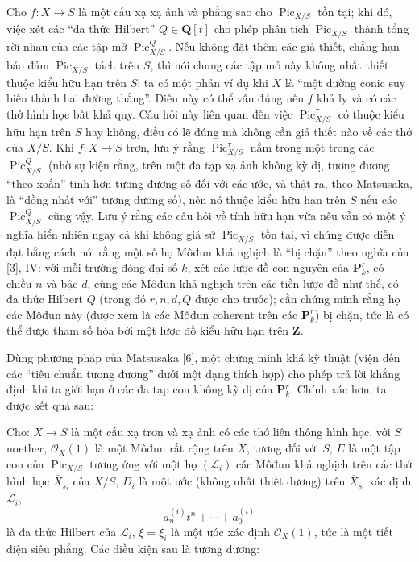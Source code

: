
Cho $f:X\longrightarrow S$ là một cấu xạ xạ ảnh và phẳng sao cho
$\operatorname{Pic}_{X/S}$ tồn tại; khi đó, việc xét các ``đa thức Hilbert''
$Q\in\mathbf Q[t]$ cho phép phân tích $\operatorname{Pic}_{X/S}$ thành tổng
rời nhau của các tập mở $\operatorname{Pic}_{X/S}^Q$. Nếu không đặt thêm các
giả thiết, chẳng hạn bảo đảm $\operatorname{Pic}_{X/S}$ tách trên $S$, thì
nói chung các tập mở này không nhất thiết thuộc kiểu hữu hạn trên $S$; ta có
một phản ví dụ khi $X$ là ``một đường conic suy biến thành hai đường thẳng''.
Điều này
có thể vẫn đúng nếu $f$ khả ly và có các thớ hình học bất khả quy. Câu hỏi này
liên quan đến việc $\operatorname{Pic}_{X/S}^\tau$ có thuộc kiểu hữu hạn trên
$S$ hay không, điều có lẽ đúng mà không cần giả thiết nào về các thớ của
$X/S$. Khi $f:X\longrightarrow S$ trơn, lưu ý rằng
$\operatorname{Pic}_{X/S}^\tau$ nằm trong một trong các
$\operatorname{Pic}_{X/S}^Q$ (nhờ sự kiện rằng, trên một đa tạp xạ ảnh không
kỳ dị, tương đương ``theo xoắn'' tinh hơn tương đương số đối với các ước, và
thật ra, theo Matsusaka, là ``đồng nhất với'' tương đương số), nên nó thuộc
kiểu hữu hạn trên $S$ nếu các $\operatorname{Pic}_{X/S}^Q$ cũng vậy. Lưu ý
rằng các câu hỏi về tính hữu hạn vừa nêu vẫn có một ý nghĩa hiển nhiên ngay cả khi
không giả sử $\operatorname{Pic}_{X/S}$ tồn tại, vì chúng được diễn đạt bằng
cách nói rằng một số họ Môđun khả nghịch là ``bị chặn'' theo nghĩa của [3],
IV: với mỗi trường đóng đại số $k$, xét các lược đồ con nguyên của
$\mathbf P_k^r$, có chiều $n$ và bậc $d$, cùng các Môđun khả nghịch trên các
tiền lược đồ như thế, có đa thức Hilbert $Q$ (trong đó $r,n,d,Q$ được cho
trước); cần chứng minh rằng họ các Môđun này (được xem là các Môđun coherent
trên các $\mathbf P_k^r$) bị chặn, tức là có thể được tham số hóa bởi một lược
đồ kiểu hữu hạn trên $\mathbf Z$.

Dùng phương pháp của Matsusaka [6], một chứng minh khá kỹ thuật (viện đến các
``tiêu chuẩn tương đương'' dưới một dạng thích hợp) cho phép trả lời khẳng định
khi ta giới hạn ở các đa tạp con không kỳ dị của $\mathbf P_k^r$. Chính xác
hơn, ta được kết quả sau:

 Cho: $X\longrightarrow S$ là một cấu xạ trơn và xạ ảnh có các thớ liên thông hình học, với $S$
noether, $\mathcal O_X(1)$ là một Môđun rất rộng trên $X$, tương đối với $S$,
$E$ là một tập con của $\operatorname{Pic}_{X/S}$ tương ứng với một họ
$(\mathcal L_i)$ các Môđun khả nghịch trên các thớ hình học
$\overline X_{s_i}$ của $X/S$, $D_i$ là một ước (không nhất thiết dương) trên
$\overline X_{s_i}$ xác định $\mathcal L_i$,
\[
a_n^{(i)}t^n+\cdots+a_0^{(i)}
\]
là đa thức Hilbert của $\mathcal L_i$, $\xi=\xi_i$ là một ước xác định
$\mathcal O_X(1)$, tức là một tiết diện siêu phẳng. Các điều kiện sau là tương
đương:


